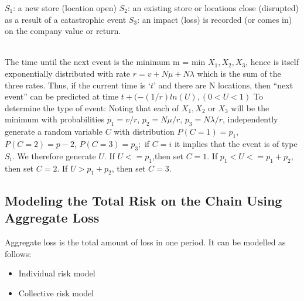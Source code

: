 \documentclass[conference]{IEEEtran}
\begin{document}
$S_1$: a new store (location open)
$S_2$: an existing store or locations close (disrupted) as a result of a catastrophic event 
$S_3$: an impact (loss) is recorded (or comes in) on the company value or return.
\\\\

The time until the next event is the minimum m = min ${X_1,X_2,X_3}$, hence is itself exponentially distributed with rate $r=v+N\mu+N\lambda$ which is the sum of the three rates. Thus, if the current time is $‘t’$ and there are N locations, then “next event” can be predicted at time $t+(-(1/r) ln(U), (0<U<1)$ \newline
To determine the type of event: Noting that each of $X_1, X_2$ or $X_3$ will be the minimum with probabilities $p_1=v/r$, $p_2=N\mu/r$, $p_3=N\lambda/r$, independently generate a random variable $C$ with distribution $P(C=1)=p_1$, $P(C=2)=p-2$, $P(C=3)=p_3;$ if $C=i$ it implies that the event is of type $S_i$. We therefore generate $U$.\newline
If $U<=p_1$,then set $C=1$. If $p_1<U<=p_1+p_2$, then set $C = 2$. If $U > p_1+p_2$, then set $C = 3$.

\subsection{Modeling the Total Risk on the Chain Using Aggregate Loss}
Aggregate loss is the total amount of loss in one period. It can be modelled as follows:
\begin{itemize}
\item Individual risk model
\item Collective risk model
\end{itemize}
\end{document}
